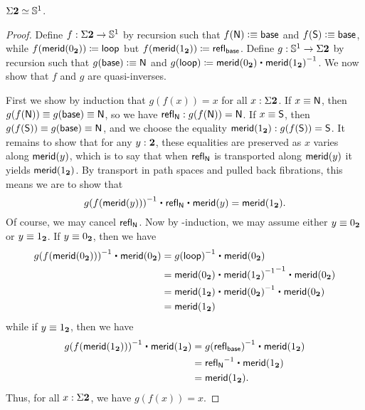 \begin{lem}\label{thm:suspbool}
  $\Sigma\mathbf{2} \simeq \mathbb{S}^1$.
\end{lem}
\begin{proof}
  Define $f:\Sigma\mathbf{2}\to\mathbb{S}^1$ by recursion such that $f(\mathsf{N})\vcentcolon\equiv \mathsf{base}$ and $f(\mathsf{S})\vcentcolon\equiv\mathsf{base}$, while ${f}({\mathsf{merid}(0_{\mathbf{2}})})\coloneqq\mathsf{loop}$ but ${f}({\mathsf{merid}(1_{\mathbf{2}})}) \coloneqq \mathsf{refl}_{\mathsf{base}}$.
  Define $g:\mathbb{S}^1\to\Sigma\mathbf{2}$ by recursion such that $g(\mathsf{base})\vcentcolon\equiv \mathsf{N}$ and $\ap g \lloop \defid \merid(\bfalse) \ct \opp{\merid(\btrue)}$.
  We now show that $f$ and $g$ are quasi-inverses.

  First we show by induction that $g(f(x))=x$ for all $x:\Sigma \mathbf{2}$.
  If $x\equiv\mathsf{N}$, then $g(f(\mathsf{N})) \equiv g(\mathsf{base})\equiv \mathsf{N}$, so we have $\mathsf{refl}_{\mathsf{N}} : g(f(\mathsf{N}))=\mathsf{N}$.
  If $x\equiv\mathsf{S}$, then $g(f(\mathsf{S})) \equiv g(\mathsf{base})\equiv \mathsf{N}$, and we choose the equality $\mathsf{merid}(1_{\mathbf{2}}) : g(f(\mathsf{S})) = \mathsf{S}$.
  It remains to show that for any $y:\mathbf{2}$, these equalities are preserved as $x$ varies along $\mathsf{merid}(y)$, which is to say that when $\mathsf{refl}_{\mathsf{N}}$ is transported along $\mathsf{merid}(y)$ it yields $\mathsf{merid}(1_{\mathbf{2}})$.
  By transport in path spaces and pulled back fibrations, this means we are to show that
  \[ \opp{\ap g {\ap f {\merid(y)}}} \ct \refl{\north} \ct \merid(y) = \merid(\btrue). \]
  Of course, we may cancel $\mathsf{refl}_{\mathsf{N}}$.
  Now by \bool-induction, we may assume either $y\equiv 0_{\mathbf{2}}$ or $y\equiv 1_{\mathbf{2}}$.
  If $y\equiv 0_{\mathbf{2}}$, then we have
  \begin{align*}
    \opp{\ap g {\ap f {\merid(\bfalse)}}} \ct \merid(\bfalse)
    &= \opp{\ap g {\lloop}} \ct \merid(\bfalse)\\
    &= \opp{\merid(\bfalse) \ct \opp{\merid(\btrue)}} \ct \merid(\bfalse)\\
    &= \merid(\btrue) \ct \opp{\merid(\bfalse)} \ct \merid(\bfalse)\\
    &= \merid(\btrue)
  \end{align*}
  while if $y\equiv 1_{\mathbf{2}}$, then we have
  \begin{align*}
    \opp{\ap g {\ap f {\merid(\btrue)}}} \ct \merid(\btrue)
    &= \opp{\ap g {\refl{\base}}} \ct \merid(\btrue)\\
    &= \opp{\refl{\north}} \ct \merid(\btrue)\\
    &= \merid(\btrue).
  \end{align*}
  Thus, for all $x:\Sigma \mathbf{2}$, we have $g(f(x))=x$.


\end{proof}
